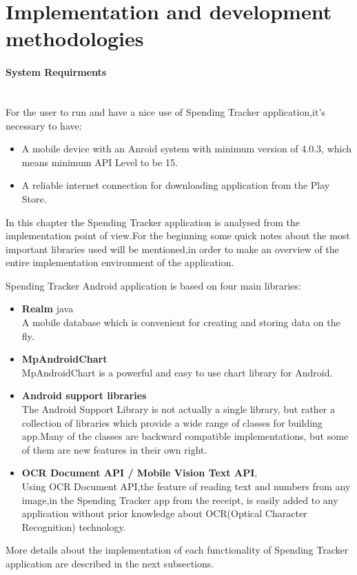 \section{Implementation and development methodologies}
\paragraph{System Requirments}\mbox{}\\
For the user to run and have a nice use of Spending Tracker application,it's necessary to have:

\begin{itemize}
	\item A mobile device with an Anroid system with minimum version of 4.0.3, which means minimum API Level to be 15.
	\item A reliable internet connection for downloading application from the Play Store.
\end{itemize}

In this chapter the Spending Tracker application is analysed from the implementation point of view.For the beginning some quick notes about the most important libraries used will be mentioned,in order to make an overview of the entire implementation environment of the application.

Spending Tracker Android application is based on four main libraries:
\begin{itemize}
	\item \textbf{Realm} java \cite{Realm} \\
	A mobile database which is convenient for creating and storing data on the fly.
	\item \textbf{MpAndroidChart} \cite{MpAndroidChart} \\
	MpAndroidChart is a powerful and easy to use chart library for Android. 	
	\item \textbf{Android support libraries} \cite{ASL} \\
	The Android Support Library is not actually a single library, but rather a collection of libraries which provide a wide range of classes for building app.Many of the classes are backward compatible implementations, but some of them are new features in their own right.
	\item \textbf{OCR Document API / Mobile Vision Text API}, \cite{Codelabs} \\
	Using OCR Document API,the feature of reading text and numbers from any image,in the Spending Tracker app from the receipt, is easily added to any application without prior knowledge about OCR(Optical Character Recognition) technology.
\end{itemize}
More details about the implementation of each functionality of Spending Tracker application are described in the next subsections.

